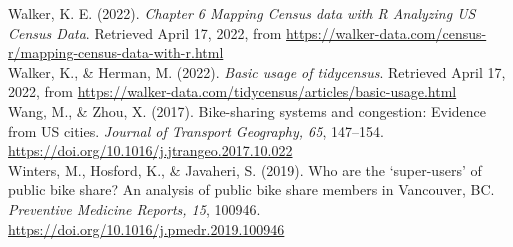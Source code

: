 \documentclass[
  12pt,
]{article}
\begin{document}
Walker, K. E. (2022). \emph{Chapter 6 Mapping Census data with R
\textbar{} Analyzing US Census Data}. Retrieved April 17, 2022, from
\url{https://walker-data.com/census-r/mapping-census-data-with-r.html}\\
Walker, K., \& Herman, M. (2022). \emph{Basic usage of tidycensus}.
Retrieved April 17, 2022, from
\url{https://walker-data.com/tidycensus/articles/basic-usage.html}\\
Wang, M., \& Zhou, X. (2017). Bike-sharing systems and congestion:
Evidence from US cities. \emph{Journal of Transport Geography, 65},
147--154. \url{https://doi.org/10.1016/j.jtrangeo.2017.10.022}\\
Winters, M., Hosford, K., \& Javaheri, S. (2019). Who are the
`super-users' of public bike share? An analysis of public bike share
members in Vancouver, BC. \emph{Preventive Medicine Reports, 15},
100946. \url{https://doi.org/10.1016/j.pmedr.2019.100946}
\end{document}

